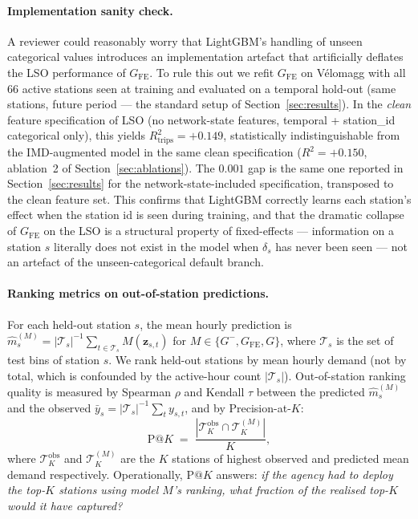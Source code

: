 \documentclass[11pt,a4paper]{article}
\begin{document}
\paragraph{Implementation sanity check.}
A reviewer could reasonably worry that LightGBM's handling of
unseen categorical values introduces an implementation artefact
that artificially deflates the LSO performance of
$G_{\mathrm{FE}}$.  To rule this out we refit $G_{\mathrm{FE}}$
on V\'elomagg with all $66$ active stations seen at training and
evaluated on a temporal hold-out (same stations, future period —
the standard setup of Section~\ref{sec:results}).  In the
\emph{clean} feature specification of LSO (no network-state
features, temporal + station\_id categorical only), this yields
$R^2_{\mathrm{trips}} = +0.149$, statistically indistinguishable
from the IMD-augmented model in the same clean specification
($R^2 = +0.150$, ablation~2 of Section~\ref{sec:ablations}).
The $0.001$ gap is the same one reported in
Section~\ref{sec:results} for the network-state-included
specification, transposed to the clean feature set.  This
confirms that LightGBM correctly learns each station's effect
when the station id is seen during training, and that the
dramatic collapse of $G_{\mathrm{FE}}$ on the LSO is a
structural property of fixed-effects — information on a station
$s$ literally does not exist in the model when
$\delta_s$ has never been seen — not an artefact of the
unseen-categorical default branch.

\paragraph{Ranking metrics on out-of-station predictions.}
For each held-out station $s$, the mean hourly prediction is
$\hat{m}_s^{(M)} = |\mathcal{T}_s|^{-1}\sum_{t \in \mathcal{T}_s} M(\mathbf{z}_{s,t})$
for $M \in \{G^-, G_{\mathrm{FE}}, G\}$, where $\mathcal{T}_s$
is the set of test bins of station $s$.  We rank held-out
stations by mean hourly demand (not by total, which is
confounded by the active-hour count $|\mathcal{T}_s|$).
Out-of-station ranking quality is measured by Spearman
$\rho$ and Kendall $\tau$ between the predicted
$\hat{m}_s^{(M)}$ and the observed
$\bar{y}_s = |\mathcal{T}_s|^{-1}\sum_{t} y_{s,t}$, and by
Precision-at-$K$:
\begin{equation}
    \mathrm{P@}K \;=\; \frac{|\mathcal{T}_K^{\mathrm{obs}} \cap \mathcal{T}_K^{(M)}|}{K},
    \label{eq:patk}
\end{equation}
where $\mathcal{T}_K^{\mathrm{obs}}$ and $\mathcal{T}_K^{(M)}$
are the $K$ stations of highest observed and predicted mean
demand respectively.  Operationally, $\mathrm{P@}K$ answers:
\emph{if the agency had to deploy the top-$K$ stations using
model $M$'s ranking, what fraction of the realised top-$K$
would it have captured?}
\end{document}
